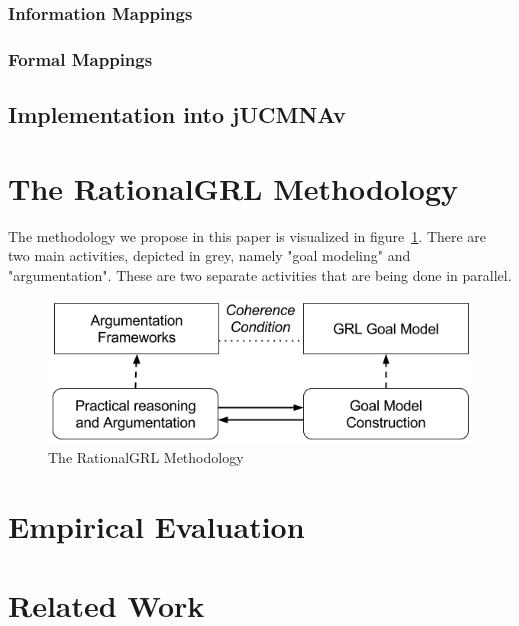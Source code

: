 \documentclass[11.5pt,two column]{llncs}
\begin{document}
\subsubsection{Information Mappings}

\subsubsection{Formal Mappings}

\subsection{Implementation into jUCMNAv}
\label{sect:implementation:implementation}

\section{The RationalGRL Methodology}
\label{sect:methodology}

The methodology we propose in this paper is visualized in figure~\ref{fig:rationalgrl-methodology}. There are two main activities, depicted in grey, namely "goal modeling" and "argumentation". These are two separate activities that are being done in parallel. 

\begin{figure}[ht]
\centering
\includegraphics[scale=0.4]{img/methodology}
\caption{The RationalGRL Methodology}
\label{fig:rationalgrl-methodology}
\end{figure}

\section{Empirical Evaluation}
\label{sect:evaluation}

\section{Related Work}
\label{sect:relatedwork}
\end{document}
